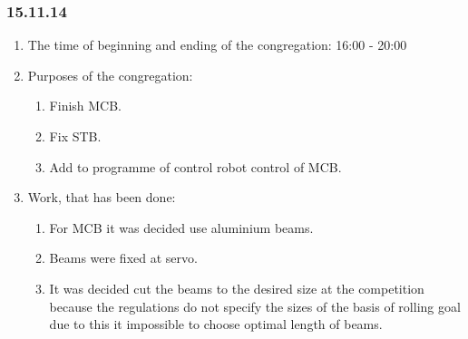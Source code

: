 
\subsubsection{15.11.14}

\begin{enumerate} 
	\item The time of beginning and ending of the congregation: 16:00 - 20:00
	
	\item Purposes of the congregation:
	\begin{enumerate}
		\item Finish MCB.
		
		\item Fix STB.
		
		\item Add to programme of control robot control of MCB.
		
	\end{enumerate}
	
	\item Work, that has been done:
	\begin{enumerate}
		\item For MCB it was decided use aluminium beams.
		
		\item Beams were fixed at servo.
		
		\item It was decided cut the beams to the desired size at the competition because the regulations do not specify the sizes of the basis of rolling goal due to this it impossible to choose optimal length of beams.
		

\end{enumerate}
\end{enumerate}
